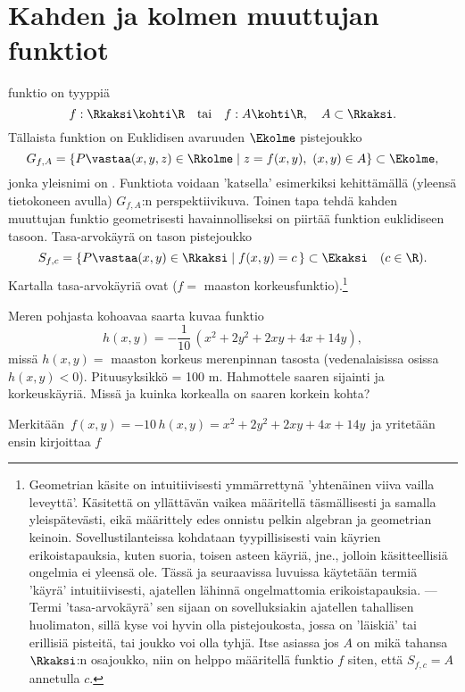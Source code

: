 \section{Kahden ja kolmen muuttujan funktiot} 
\label{kahden ja kolmen muuttujan funktiot}
\alku
{}

 funktio on tyyppiä
\[ 
f:\Rkaksi \kohti \R \quad \text{tai} \quad f:A \kohti \R, \quad A\subset\Rkaksi. 
\]
%
Tällaista funktion  on Euklidisen avaruuden $\Ekolme$ pistejoukko
\[
G_{f,A}=\{P \vastaa (x,y,z) \in \Rkolme \mid z=f(x,y), \ (x,y)\in A\} \subset \Ekolme,
\]
jonka yleisnimi on . Funktiota voidaan 'katsella' esimerkiksi kehittämällä
(yleensä tietokoneen avulla) $G_{f,A}$:n perspektiivikuva. Toinen tapa tehdä kahden muuttujan
funktio geometrisesti havainnolliseksi on piirtää funktion
%
 euklidiseen tasoon. Tasa-arvokäyrä on tason pistejoukko
\[
S_{f,c}=\{P \vastaa (x,y)\in \Rkaksi \mid f(x,y)=c\,\} \subset \Ekaksi \quad (c\in\R).
\]
Kartalla tasa-arvokäyriä ovat  ($f=$ maaston 
korkeusfunktio).\footnote[2]{Geometrian käsite  on intuitiivisesti ymmärrettynä
'yhtenäinen viiva vailla leveyttä'. Käsitettä on yllättävän vaikea määritellä
täsmällisesti ja samalla yleispätevästi, eikä määrittely edes onnistu pelkin algebran ja 
geometrian keinoin. Sovellustilanteissa kohdataan tyypillisisesti vain käyrien
erikoistapauksia, kuten suoria, toisen asteen käyriä, jne., jolloin käsitteellisiä ongelmia ei
yleensä ole. Tässä ja seuraavissa luvuissa käytetään termiä 'käyrä' intuitiivisesti,
ajatellen lähinnä ongelmattomia erikoistapauksia. --- Termi 'tasa-arvokäyrä' sen sijaan on
sovelluksiakin ajatellen tahallisen huolimaton, sillä kyse voi hyvin olla pistejoukosta, jossa
on 'läiskiä' tai erillisiä pisteitä, tai joukko voi olla tyhjä. Itse asiassa jos $A$ on mikä
tahansa $\Rkaksi$:n osajoukko, niin on helppo määritellä funktio $f$ siten, että $S_{f,c}=A$
annetulla $c$. }
\begin{Exa} \label{saari}
Meren pohjasta kohoavaa saarta kuvaa funktio
\[
h(x,y) = -\frac{1}{10}\,(x^2+2y^2+2xy+4x+14y),
\]
missä $h(x,y)=$ maaston korkeus merenpinnan tasosta (vedenalaisissa osissa $h(x,y)<0$). 
Pituusyksikkö = 100 m. Hahmottele saaren sijainti ja korkeuskäyriä. Missä ja kuinka korkealla 
on saaren korkein kohta?
\end{Exa}
\ratk
Merkitään $\,f(x,y) = -10\,h(x,y)=x^2+2y^2+2xy+4x+14y\,$ ja yritetään ensin kirjoittaa $f$
